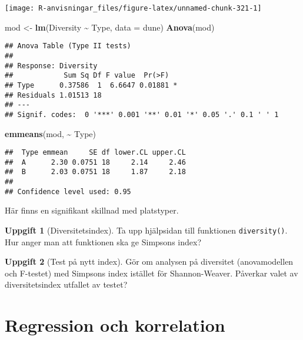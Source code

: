 \documentclass[
]{book}
\newenvironment{Shaded}{\begin{snugshade}}{\end{snugshade}}
\newcommand{\AttributeTok}[1]{\textcolor[rgb]{0.13,0.29,0.53}{#1}}
\newcommand{\FunctionTok}[1]{\textcolor[rgb]{0.13,0.29,0.53}{\textbf{#1}}}
\newcommand{\NormalTok}[1]{#1}
\newcommand{\OtherTok}[1]{\textcolor[rgb]{0.56,0.35,0.01}{#1}}
\newcommand{\SpecialCharTok}[1]{\textcolor[rgb]{0.81,0.36,0.00}{\textbf{#1}}}
\theoremstyle{definition}
\theoremstyle{definition}
\theoremstyle{definition}
\newtheorem{exercise}{Uppgift}[chapter]
\theoremstyle{definition}
\theoremstyle{remark}
\begin{document}
\begin{center}\texttt{[image: R-anvisningar\_files/figure-latex/unnamed-chunk-321-1]} \end{center}

\begin{Shaded}
\begin{Highlighting}[]
\NormalTok{mod }\OtherTok{\textless{}{-}} \FunctionTok{lm}\NormalTok{(Diversity }\SpecialCharTok{\textasciitilde{}}\NormalTok{ Type, }\AttributeTok{data =}\NormalTok{ dune)}
\FunctionTok{Anova}\NormalTok{(mod)}
\end{Highlighting}
\end{Shaded}

\begin{verbatim}
## Anova Table (Type II tests)
## 
## Response: Diversity
##            Sum Sq Df F value  Pr(>F)  
## Type      0.37586  1  6.6647 0.01881 *
## Residuals 1.01513 18                  
## ---
## Signif. codes:  0 '***' 0.001 '**' 0.01 '*' 0.05 '.' 0.1 ' ' 1
\end{verbatim}

\begin{Shaded}
\begin{Highlighting}[]
\FunctionTok{emmeans}\NormalTok{(mod, }\SpecialCharTok{\textasciitilde{}}\NormalTok{ Type)}
\end{Highlighting}
\end{Shaded}

\begin{verbatim}
##  Type emmean     SE df lower.CL upper.CL
##  A      2.30 0.0751 18     2.14     2.46
##  B      2.03 0.0751 18     1.87     2.18
## 
## Confidence level used: 0.95
\end{verbatim}

Här finns en signifikant skillnad med platstyper.

\begin{exercise}[Diversitetsindex]
Ta upp hjälpsidan till funktionen \texttt{diversity()}. Hur anger man att funktionen ska ge Simpsons index?
\end{exercise}

\begin{exercise}[Test på nytt index]
Gör om analysen på diversitet (anovamodellen och F-testet) med Simpsons index istället för Shannon-Weaver. Påverkar valet av diversitetsindex utfallet av testet?
\end{exercise}

\hypertarget{regression-och-korrelation}{%
\chapter{Regression och korrelation}\label{regression-och-korrelation}}
\end{document}
